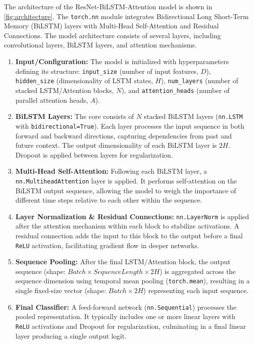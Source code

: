 The architecture of the ResNet-BiLSTM-Attention model is shown in \autoref{fig:architecture}. The \texttt{torch.nn} module integrates Bidirectional Long Short-Term Memory (BiLSTM) layers with Multi-Head Self-Attention and Residual Connections. The model architecture consists of several layers, including convolutional layers, BiLSTM layers, and attention mechanisms.

\begin{enumerate}
    \item \textbf{Input/Configuration:} The model is initialized with hyperparameters defining its structure: \texttt{input\_size} (number of input features, $D$), \texttt{hidden\_size} (dimensionality of LSTM states, $H$), \texttt{num\_layers} (number of stacked LSTM/Attention blocks, $N$), and \texttt{attention\_heads} (number of parallel attention heads, $A$).

    \item \textbf{BiLSTM Layers:} The core consists of $N$ stacked BiLSTM layers (\texttt{nn.LSTM} with \texttt{bidirectional=True}). Each layer processes the input sequence in both forward and backward directions, capturing dependencies from past and future context. The output dimensionality of each BiLSTM layer is $2H$. Dropout is applied between layers for regularization.

    \item \textbf{Multi-Head Self-Attention:} Following each BiLSTM layer, a \texttt{nn.MultiheadAttention} layer is applied. It performs self-attention on the BiLSTM output sequence, allowing the model to weigh the importance of different time steps relative to each other within the sequence.

    \item \textbf{Layer Normalization \& Residual Connections:} \texttt{nn.LayerNorm} is applied after the attention mechanism within each block to stabilize activations. A residual connection adds the input to this block to the output before a final \texttt{ReLU} activation, facilitating gradient flow in deeper networks.

    \item \textbf{Sequence Pooling:} After the final LSTM/Attention block, the output sequence (shape: $Batch \times Sequence Length \times 2H$) is aggregated across the sequence dimension using temporal mean pooling (\texttt{torch.mean}), resulting in a single fixed-size vector (shape: $Batch \times 2H$) representing each input sequence.

    \item \textbf{Final Classifier:} A feed-forward network (\texttt{nn.Sequential}) processes the pooled representation. It typically includes one or more linear layers with \texttt{ReLU} activations and Dropout for regularization, culminating in a final linear layer producing a single output logit.


\end{enumerate}
